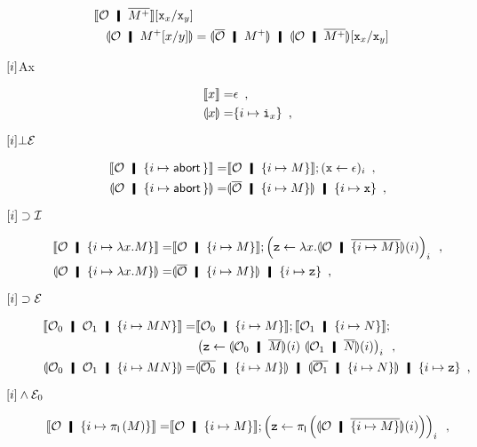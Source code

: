 \begin{description}
\begin{align*}
       \semo{{\hypert}\hmid \overline{\m{M}}}[\p x_x/ \p x_y]\\
       \semoi{\hypert\hmid \m{M}[x/y]}&=
       \semoi{\overline{\hypert}\hmid \m{M}} \hmid
       \semoi{{\hypert}\hmid \overline{\m{M}}}[\p x_x/ \p x_y]
      \end{align*}
 \item[$\lbrack {i}\rbrack$Ax]
      \begin{align*}
       \llbracket{x}\rrbracket=& \epsilon \enspace,\\
       \llparenthesis{x}\rrparenthesis=& \{i\mapsto \texttt{i}_x\}\enspace,
      \end{align*}
 \item[${\lbrack {i}\rbrack}\bot\mathcal E$]
      \begin{align*}
       \semo{\hypert\hmid\{i\mapsto\abort\}}
       =&\semo{\hypert\hmid\{i\mapsto M\}} ; (\p x\leftarrow \epsilon)_i\enspace,\\
       \semoi{\hypert\hmid\{i\mapsto\abort\}}
       =&\semoi{\overline{\hypert}\hmid\{i\mapsto M\}} \hmid \{i\mapsto
       \p x\}\enspace,
      \end{align*}
 \item[$\lbrack {i}\rbrack\supset\mathcal I$]
\begin{align*}
 \semo{\hypert\hmid \{i\mapsto \lambda x.M\}}=
 & \semo{\hypert\hmid \imapsto{M}}; \left(\p z\leftarrow
 \lambda x. \semoi{\hypert\hmid\overline{\imapsto{M}}}(i)\right)_i \enspace,\\
 \semoi{\hypert\hmid \imapsto{\lambda x.M}} =& \semoi{\overline\hypert\hmid
 \imapsto{M}} \hmid \{i\mapsto \p z\}\enspace,
\end{align*}
 \item[$\lbrack {i}\rbrack\supset\mathcal E$]
\begin{align*}
 \semo{\hypert_0\hmid\hypert_1\hmid \imapsto{MN}}=&
 \semo{\hypert_0\hmid \imapsto{M}};
 \semo{\hypert_1\hmid \imapsto{N}};\\&
 \left(\p z\leftarrow \semoi{\hypert_0\hmid \overline{
 M}}(i)\,\,\semoi{\hypert_1\hmid \overline N}(i)\right)_i\enspace,\\
 \semoi{\hypert_0\hmid\hypert_1\hmid \imapsto{MN}} =&
 \semoi{\overline{\hypert_0}\hmid \imapsto{M}} \hmid
 \semoi{\overline{\hypert_1}\hmid \imapsto{N}}
 \hmid \{i\mapsto \p z\}\enspace,
\end{align*}
 \item[$\lbrack {i}\rbrack\wedge\mathcal E_0$]
\begin{align*}
 \semo{\hypert\hmid \imapsto{\lpil M}} =& \semo{\hypert\hmid \imapsto{M}};
 \left(\p z \leftarrow
 \lpil {\semoi{\hypert\hmid\overline{\imapsto{M}}}(i)}\right)_i\enspace, \\

\end{align*}
\end{description}
